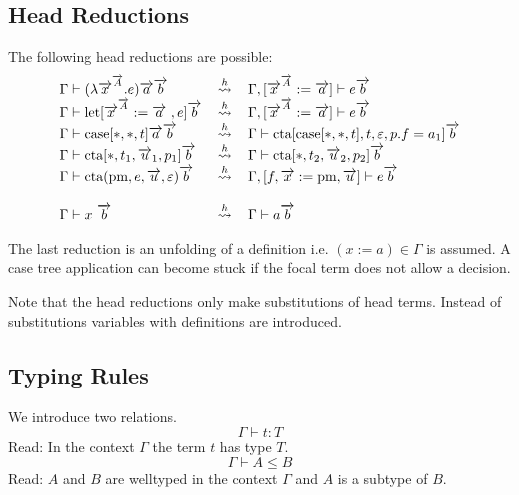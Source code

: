 \subsection{Head Reductions}

The following head reductions are possible:
$$
\begin{array}{llll}
        \Gamma \vdash (\lambda \vec x^{\vec A}. e) \vec a \vec b
        &\hreduce&
        \Gamma, [\vec x^{\vec A} := \vec a] \vdash e \vec b
        \\
        \Gamma \vdash \llet[\vec x^{\vec A} := \vec a , e] \vec b
        &\hreduce&
        \Gamma, [\vec x^{\vec A} := \vec a] \vdash e \vec b
        \\
        \Gamma \vdash \case[*, *, t] \vec a \vec b
        &\hreduce&
        \Gamma \vdash \cta[\case[*,*,t], t, \empty, p.f = a_1] \vec b
        \\
        \Gamma \vdash \cta[*, t_1, \vec u_1, p_1] \vec b
        &\hreduce&
        \Gamma \vdash \cta[*, t_2, \vec u_2, p_2] \vec b
        \\
        \Gamma
        \vdash
        \cta(\text{pm}, e, \vec u, \empty) \vec b
        &\hreduce&
        \Gamma, [f,\vec x := \text{pm}, \vec u]
        \vdash
        e \vec b
        \\
        \\
        \Gamma \vdash x \vec b
        &\hreduce&
        \Gamma \vdash a \vec b
\end{array}
$$

The last reduction is an unfolding of a definition i.e. $(x:=a) \in \Gamma$ is
assumed. A case tree application can become stuck if the focal term does not
allow a decision.

Note that the head reductions only make substitutions of head terms. Instead of
substitutions variables with definitions are introduced.






\subsection{Typing Rules}

We introduce two relations.
$$
\Gamma \vdash t: T
$$
Read: In the context $\Gamma$ the term $t$ has type $T$.
$$
\Gamma \vdash A \le B
$$
Read: $A$ and $B$ are welltyped in the context $\Gamma$ and $A$ is a subtype of
$B$.





